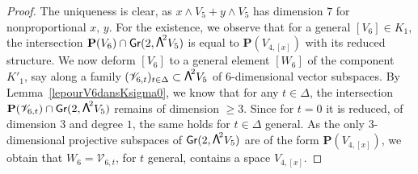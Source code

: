 \documentclass[JEP,XML,SOM,Unicode, NoEqCountersInSection,NoFloatCountersInSection]{cedram}
\let\mathcal\mathscr
\theoremstyle{definition}
\renewcommand\P{{\mathbf P}}\let\PP\P
\newcommand\cV{\mathcal{V}}
\DeclareMathOperator{\Gr}{\mathsf{Gr}}
\newcommand\bw[1]{{\hbox{\large$\mathsf{\Lambda}$}^{\!#1}}}
\begin{document}
\begin{proof} The uniqueness is clear, as $x\wedge V_5+y\wedge V_5$ has dimension $7$
for nonproportional $x,\,y$. For the existence, we observe that for a general $[V_6]\in K_1$, the intersection $\P(V_6)\cap \Gr(2, \bw2V_5)$ is equal to
$\P(V_{4,[x]})$ with its reduced structure.
We now deform $[V_6]$ to a general element $[W_6]$ of the component $K'_1$, say along
a family $(\cV _{6,t})_{t\in \Delta}\subset \bw2V_5$ of
$6$-dimensional vector subspaces.
By Lemma~\ref{lepourV6dansKsigma0},
we know that for any $t\in \Delta$, the intersection $\P(\cV _{6,t})\cap \Gr(2, \bw2V_5)$ remains of dimension $\geq3$. Since for $t=0$ it is reduced, of dimension $3$ and degree $1$,
the same holds for $t\in \Delta$ general. As the only $3$-dimensional projective subspaces
of $\Gr(2, \bw2V_5)$ are of the form $\P(V_{4,[x]})$, we obtain that $W_6=\cV _{6,t}$, for $t$ general, contains a space $V_{4,[x]}$.
\end{proof}
\end{document}

